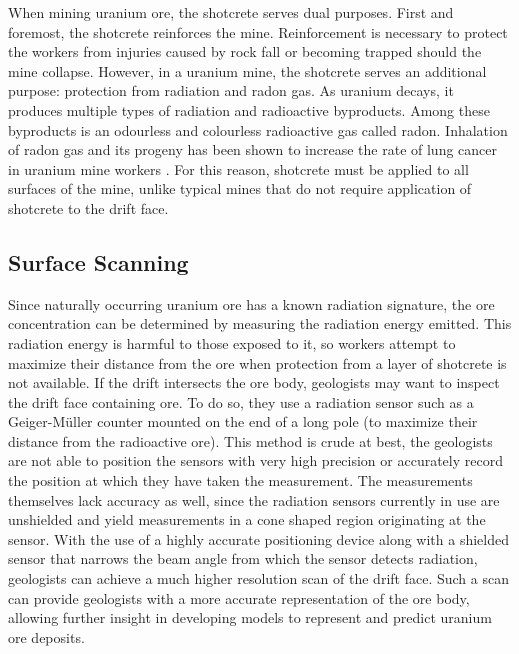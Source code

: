 When mining uranium ore, the shotcrete serves dual purposes. First and foremost, the shotcrete reinforces the mine. Reinforcement is necessary to protect the workers from injuries caused by rock fall or becoming trapped should the mine collapse. However, in a uranium mine, the shotcrete serves an additional purpose: protection from radiation and radon gas. As uranium decays, it produces multiple types of radiation and radioactive byproducts. Among these byproducts is an odourless and colourless radioactive gas called radon. Inhalation of radon gas and its progeny has been shown to increase the rate of lung cancer in uranium mine workers \cite{radon}. For this reason, shotcrete must be applied to all surfaces of the mine, unlike typical mines that do not require application of shotcrete to the drift face.\\

\subsection{Surface Scanning}

Since naturally occurring uranium ore has a known radiation signature, the ore concentration can be determined by measuring the radiation energy emitted. This radiation energy is harmful to those exposed to it, so workers attempt to maximize their distance from the ore when protection from a layer of shotcrete is not available. If the drift intersects the ore body, geologists may want to inspect the drift face containing ore. To do so, they use a radiation sensor such as a Geiger-M{\"u}ller counter mounted on the end of a long pole (to maximize their distance from the radioactive ore). This method is crude at best, the geologists are not able to position the sensors with very high precision or accurately record the position at which they have taken the measurement. The measurements themselves lack accuracy as well, since the radiation sensors currently in use are unshielded and yield measurements in a cone shaped region originating at the sensor. With the use of a highly accurate positioning device along with a shielded sensor that narrows the beam angle from which the sensor detects radiation, geologists can achieve a much higher resolution scan of the drift face. Such a scan can provide geologists with a more accurate representation of the ore body, allowing further insight in developing models to represent and predict uranium ore deposits.\\


